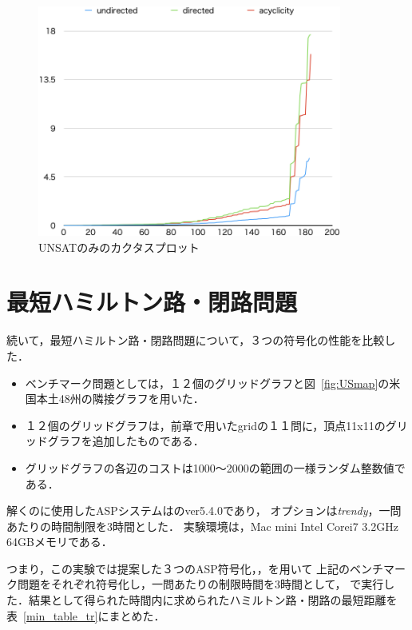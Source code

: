 \begin{figure}[htbp]
\begin{center}
  \includegraphics[width=10cm]{fig/cactusunsat.png}
\caption{UNSATのみのカクタスプロット}
\label{cactusunsat}
\end{center}
\end{figure}
\section{最短ハミルトン路・閉路問題}
続いて，最短ハミルトン路・閉路問題について，３つの符号化の性能を比較した．

\begin{itemize}
\item ベンチマーク問題としては，１２個のグリッドグラフと図~\ref{fig:USmap}の米国本土48州の隣接グラフを用いた．
\item １２個のグリッドグラフは，前章で用いたgridの１１問に，頂点11x11のグリッドグラフを追加したものである．
\item グリッドグラフの各辺のコストは1000〜2000の範囲の一様ランダム整数値である．
\end{itemize}

解くのに使用したASPシステムは{\clingo}のver5.4.0であり，
オプションは\textit{trendy}，一問あたりの時間制限を3時間とした．
実験環境は，Mac mini Intel Corei7 3.2GHz 64GBメモリである．

つまり，この実験では提案した３つのASP符号化，，を用いて
上記のベンチマーク問題をそれぞれ符号化し，一問あたりの制限時間を3時間として，
{\clingo}で実行した．結果として得られた時間内に求められたハミルトン路・閉路の最短距離を表~\ref{min_table_tr}にまとめた．


